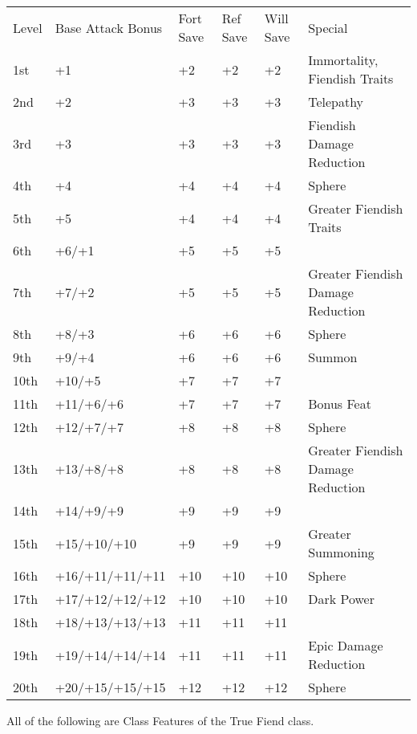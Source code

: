 \begin{table}[tbh]
\begin{small}
\begin{tabular}{lp{3.5cm}p{0.7cm}p{0.7cm}p{0.7cm}l}
Level  &Base Attack  Bonus &Fort Save &Ref Save &Will Save &Special\\
1st &+1 &+2 &+2 &+2 &Immortality, Fiendish Traits\\
2nd &+2 &+3 &+3 &+3 &Telepathy\\
3rd &+3 &+3 &+3 &+3 &Fiendish Damage Reduction\\
4th &+4 &+4 &+4 &+4 &Sphere\\
5th &+5 &+4 &+4 &+4 &Greater Fiendish Traits\\
6th &+6/+1 &+5 &+5 &+5 &\\
7th &+7/+2 &+5 &+5 &+5 &Greater Fiendish Damage Reduction\\
8th &+8/+3 &+6 &+6 &+6 &Sphere\\
9th &+9/+4 &+6 &+6 &+6 &Summon\\
10th &+10/+5 &+7 &+7 &+7 &\\
11th &+11/+6/+6 &+7 &+7 &+7 &Bonus Feat\\
12th &+12/+7/+7 &+8 &+8 &+8 &Sphere\\
13th &+13/+8/+8 &+8 &+8 &+8 &Greater Fiendish Damage Reduction\\
14th &+14/+9/+9 &+9 &+9 &+9 &\\
15th &+15/+10/+10 &+9 &+9 &+9 &Greater Summoning\\
16th &+16/+11/+11/+11 &+10 &+10 &+10 &Sphere\\
17th &+17/+12/+12/+12 &+10 &+10 &+10 &Dark Power\\
18th &+18/+13/+13/+13 &+11 &+11 &+11 &\\
19th &+19/+14/+14/+14 &+11 &+11 &+11 &Epic Damage Reduction\\
20th &+20/+15/+15/+15 &+12 &+12 &+12 &Sphere\\
\end{tabular}
\end{small}
\end{table}

\smallskip\noindent All of the following are Class Features of the True Fiend class.



